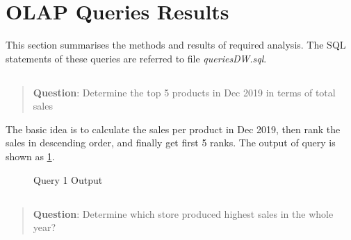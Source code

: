\documentclass[
  a4paper,
]{article}
\begin{document}
\hypertarget{olap-queries-results}{%
\section{OLAP Queries Results}\label{olap-queries-results}}

This section summarises the methods and results of required analysis.
The SQL statements of these queries are referred to file
\emph{queriesDW.sql}.

\let\oldsubsection\thesubsection
\renewcommand*{\thesubsection}{Question~\arabic{subsection}}

\hypertarget{section}{%
\subsection{}\label{section}}

\begin{quote}
\textbf{Question}: Determine the top 5 products in Dec 2019 in terms of
total sales
\end{quote}

The basic idea is to calculate the sales per product in Dec 2019, then
rank the sales in descending order, and finally get first 5 ranks. The
output of query is shown as \cref{fig:q1-output}.

\begin{figure}
    \centering
    \caption{Query 1 Output\label{fig:q1-output}}
\end{figure}

\hypertarget{section-1}{%
\subsection{}\label{section-1}}

\begin{quote}
\textbf{Question}: Determine which store produced highest sales in the
whole year?
\end{quote}
\end{document}
